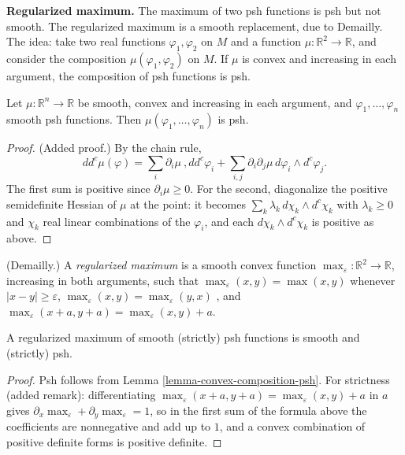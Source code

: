 \medskip\noindent
{\bf Regularized maximum.} The maximum of two
psh functions is psh but not smooth. The
regularized maximum is a smooth replacement,
due to Demailly. The idea: take two real
functions $\varphi_1,\varphi_2$ on $M$ and a
function
$\mu\colon\mathbb{R}^2\to\mathbb{R}$, and
consider the composition
$\mu(\varphi_1,\varphi_2)$ on $M$. If $\mu$
is convex and increasing in each argument,
the composition of psh functions is psh.

\begin{lemma}
\label{lemma-convex-composition-psh}
Let $\mu\colon\mathbb{R}^n\to\mathbb{R}$ be
smooth, convex and increasing in each
argument, and $\varphi_1,\dots,\varphi_n$
smooth psh functions. Then
$\mu(\varphi_1,\dots,\varphi_n)$ is psh.
\end{lemma}

\begin{proof}
(Added proof.) By the
chain rule,
$$
dd^c\mu(\varphi)=\sum_i\partial_i\mu\
,dd^c\varphi_i+\sum_{i
,j}\partial_i\partial_j\mu\,d\varphi_i
\wedge d^c\varphi_j .
$$
The first sum is positive since
$\partial_i\mu\geq0$. For the second,
diagonalize the positive semidefinite Hessian
of $\mu$ at the point: it becomes
$\sum_k\lambda_k\,d\chi_k\wedge d^c\chi_k$
with $\lambda_k\geq0$ and $\chi_k$ real
linear combinations of the $\varphi_i$, and
each $d\chi_k\wedge d^c\chi_k$ is positive as
above.
\end{proof}

\begin{definition}
\label{definition-regularized-maximum}
(Demailly.) A \textit{regularized maximum} is
a smooth convex function
$\max_\varepsilon\colon\mathbb{R}^2
\to\mathbb{R}$,
increasing in both arguments, such that
$\max_\varepsilon(x,y)=\max(x,y)$ whenever
$|x-y|\geq\varepsilon$,
$\max_\varepsilon(x,y)=\max_\varepsilon(y,x)$
,
and
$\max_\varepsilon(x+a,y+a)=\max_\varepsilon(x
,y)+a$.
\end{definition}

\begin{corollary}
\label{corollary-regularized-maximum-psh}
A regularized maximum of smooth (strictly)
psh functions is smooth and (strictly) psh.
\end{corollary}

\begin{proof}
Psh follows from Lemma
\ref{lemma-convex-composition-psh}. For
strictness (added remark): differentiating
$\max_\varepsilon(x+a,y+a)=\max_\varepsilon(x
,y)+a$
in $a$ gives
$\partial_x\max_\varepsilon
+\partial_y\max_\varepsilon=1$,
so in the first sum of the formula above the
coefficients are nonnegative and add up to
$1$, and a convex combination of positive
definite forms is positive definite.
\end{proof}

